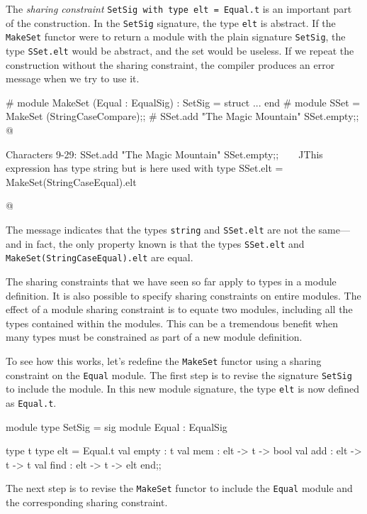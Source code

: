 The \emph{sharing constraint}
\hbox{\lstinline$SetSig with type elt = Equal.t$}
is an important part of the construction.  In
the \hbox{\lstinline/SetSig/} signature, the type \texttt{elt} is
abstract.  If the \hbox{\lstinline/MakeSet/} functor were to return a
module with the plain signature \hbox{\lstinline/SetSig/}, the
type \hbox{\lstinline/SSet.elt/} would be abstract, and the set would
be useless.  If we repeat the construction without the sharing
constraint, the compiler produces an error message when we try to use
it.

\begin{ocaml}
# module MakeSet (Equal : EqualSig) : SetSig = struct ... end
# module SSet = MakeSet (StringCaseCompare);;
# SSet.add "The Magic Mountain" SSet.empty;;
@
\begin{toperror}
Characters 9-29:
  SSet.add "The Magic Mountain" SSet.empty;;
           ^^^^^^^^^^^^^^^^^^^^
This expression has type string but is here used with type
  SSet.elt = MakeSet(StringCaseEqual).elt
\end{toperror}
@
\end{ocaml}
%
The message indicates that the types \hbox{\lstinline$string$}
and \hbox{\lstinline$SSet.elt$} are not the same---and in fact, the
only property known is that the types \hbox{\lstinline$SSet.elt$}
and \hbox{\lstinline$MakeSet(StringCaseEqual).elt$} are equal.


The sharing constraints that we have seen so far apply to types in a
module definition.  It is also possible to specify sharing constraints
on entire modules.  The effect of a module sharing constraint is to
equate two modules, including all the types contained within the
modules.  This can be a tremendous benefit when many types must be
constrained as part of a new module definition.

To see how this works, let's redefine the \hbox{\lstinline$MakeSet$}
functor using a sharing constraint on the \hbox{\lstinline$Equal$}
module.  The first step is to revise the
signature \hbox{\lstinline$SetSig$} to include the module.  In this
new module signature, the type \hbox{\lstinline$elt$} is now defined
as \hbox{\lstinline$Equal.t$}.

\begin{ocaml}
module type SetSig = sig
   module Equal : EqualSig

   type t
   type elt = Equal.t
   val empty : t
   val mem : elt -> t -> bool
   val add : elt -> t -> t
   val find : elt -> t -> elt
end;;
\end{ocaml}
%
The next step is to revise the \hbox{\lstinline$MakeSet$} functor to
include the \hbox{\lstinline$Equal$} module and the corresponding
sharing constraint.

